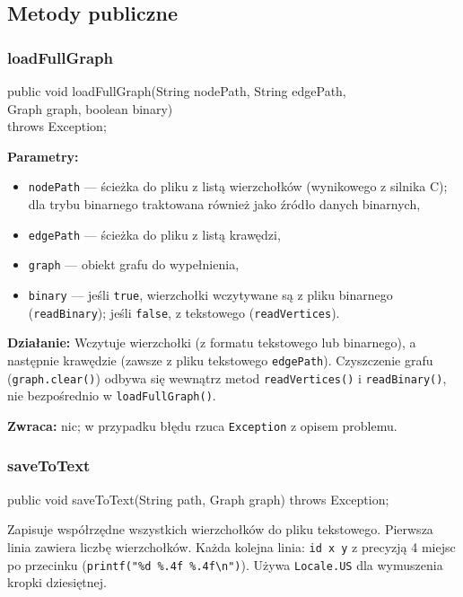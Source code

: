 \documentclass[a4paper, 11pt]{article}
\begin{document}
\subsection{Metody publiczne}

\subsubsection{loadFullGraph}

\begin{cmdbox}
public void loadFullGraph(String nodePath, String edgePath,\\
\quad\qquad\qquad\qquad\quad\; Graph graph, boolean binary)\\
\quad\qquad\qquad\qquad\quad\; throws Exception;
\end{cmdbox}

\textbf{Parametry:}
\begin{itemize}
  \item \texttt{nodePath} --- ścieżka do pliku z listą wierzchołków
    (wynikowego z silnika C); dla trybu binarnego traktowana również
    jako źródło danych binarnych,
  \item \texttt{edgePath} --- ścieżka do pliku z listą krawędzi,
  \item \texttt{graph} --- obiekt grafu do wypełnienia,
  \item \texttt{binary} --- jeśli \texttt{true}, wierzchołki wczytywane
    są z pliku binarnego (\texttt{readBinary}); jeśli \texttt{false},
    z tekstowego (\texttt{readVertices}).
\end{itemize}

\textbf{Działanie:} Wczytuje wierzchołki (z formatu tekstowego lub
binarnego), a następnie krawędzie (zawsze z pliku tekstowego
\texttt{edgePath}). Czyszczenie grafu (\texttt{graph.clear()}) odbywa się wewnątrz metod \texttt{readVertices()} i \texttt{readBinary()}, nie bezpośrednio w \texttt{loadFullGraph()}.

\textbf{Zwraca:} nic; w przypadku błędu rzuca \texttt{Exception}
z opisem problemu.

\subsubsection{saveToText}

\begin{cmdbox}
public void saveToText(String path, Graph graph) throws Exception;
\end{cmdbox}

Zapisuje współrzędne wszystkich wierzchołków do pliku tekstowego.
Pierwsza linia zawiera liczbę wierzchołków. Każda kolejna linia:
\texttt{id x y} z precyzją 4 miejsc po przecinku
(\texttt{printf("\%d \%.4f \%.4f\textbackslash n")}). Używa \texttt{Locale.US}
dla wymuszenia kropki dziesiętnej.
\end{document}
